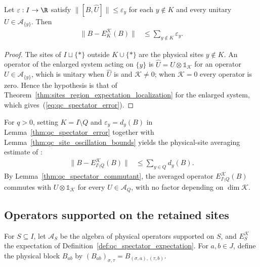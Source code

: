 \begin{lemma}
    \label{thm:qc_spectator_error}
    \leanok
    Let $\varepsilon:I\to\R$ satisfy
    $\|[B,\widehat U]\|\le\varepsilon_y$ for each $y\notin K$ and
    every unitary $U\in\mathcal A_{\{y\}}$. Then
    \begin{align}
        \|B-E_K^{\mathcal K}(B)\|
         & \le\sum_{y\notin K}\varepsilon_y.
        \label{eq:qc_spectator_error}
    \end{align}
\end{lemma}
\begin{proof}
    \leanok
    The sites of $I\sqcup\{\ast\}$ outside $K\cup\{\ast\}$ are the physical
    sites $y\notin K$. An operator of the enlarged system acting on $\{y\}$ is
    $\widehat U=U\otimes\mathbb 1_{\mathcal K}$ for an operator
    $U\in\mathcal A_{\{y\}}$, which is unitary when $\widehat U$ is and
    $\mathcal K\neq0$; when $\mathcal K=0$ every operator is zero. Hence the
    hypothesis is that of Theorem~\ref{thm:sites_region_expectation_localization} for
    the enlarged system, which gives~(\ref{eq:qc_spectator_error}).
\end{proof}

For $q>0$, setting $K=I\setminus Q$ and $\varepsilon_y=d_y(B)$ in
Lemma~\ref{thm:qc_spectator_error} together with
Lemma~\ref{thm:qc_site_oscillation_bounds} yields the physical-site
averaging estimate of \cite{OpenAI2026AreaLaw}:
\begin{align}
    \|B-E_{I\setminus Q}^{\mathcal K}(B)\|
     & \le\sum_{y\in Q}d_y(B).
    \label{eq:qc_osc_averaging_error}
\end{align}
By Lemma~\ref{thm:qc_spectator_commutant}, the averaged operator
$E_{I\setminus Q}^{\mathcal K}(B)$ commutes with $U\otimes\mathbb 1_{\mathcal K}$
for every $U\in\mathcal A_Q$, with no factor depending on $\dim\mathcal K$.

\subsection{Operators supported on the retained sites}

For $S\subseteq I$, let $\mathcal A_S$ be the algebra of physical operators
supported on $S$, and $E_S^{\mathcal K}$ the expectation of
Definition~\ref{def:qc_spectator_expectation}. For $a,b\in J$, define the
physical block $B_{ab}$ by $(B_{ab})_{\sigma,\tau}=B_{(\sigma,a),(\tau,b)}$.

